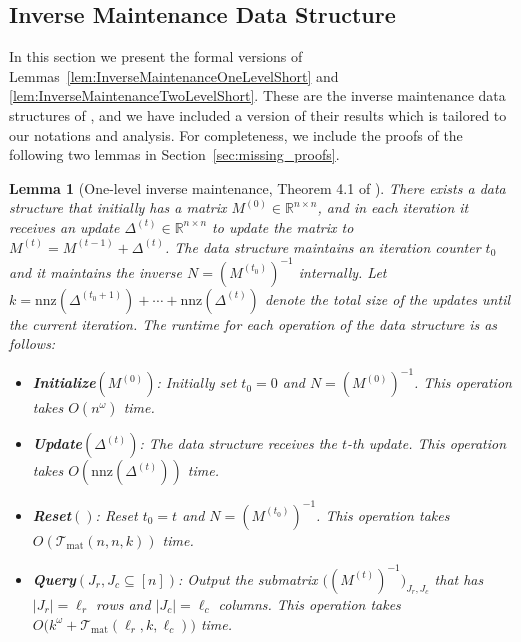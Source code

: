 \documentclass[11pt]{article}
\newtheorem{lemma}[theorem]{Lemma}
\newcommand{\Tmat}{\mathcal{T}_{\mathrm{mat}}}
\newcommand{\nnz}{\mathrm{nnz}}
\newcommand\NN{\boldsymbol{\mathit{N}}}
\newcommand\MM{\boldsymbol{\mathit{M}}}
\newcommand\R{\mathbb{R}}
\begin{document}
\subsection{Inverse Maintenance Data Structure}\label{sec:InverseMaintenance}
In this section we present the formal versions of Lemmas~\ref{lem:InverseMaintenanceOneLevelShort} and \ref{lem:InverseMaintenanceTwoLevelShort}. These are the inverse maintenance data structures of \cite{bns19}, and we have included a version of their results which is tailored to our notations and analysis. For completeness, we include the proofs of the following two lemmas in Section~\ref{sec:missing_proofs}.
\begin{lemma}[One-level inverse maintenance, Theorem 4.1 of \cite{bns19}]
\label{lem:InverseMaintenanceOneLevel}
There exists a data structure that initially has a matrix $\MM^{(0)} \in \R^{n \times n}$, and in each iteration it receives an update $\Delta^{(t)} \in \R^{n \times n}$ to update the matrix to $\MM^{(t)} = \MM^{(t-1)} + \Delta^{(t)}$. The data structure maintains an iteration counter $t_0$ and it maintains the inverse $\NN = (\MM^{(t_0)})^{-1}$ internally. Let $k = \nnz(\Delta^{(t_0+1)}) + \cdots + \nnz(\Delta^{(t)})$ denote the total size of the updates until the current iteration. The runtime for each operation of the data structure is as follows:
\begin{itemize}
\item {\bf Initialize$(\MM^{(0)})$}: Initially set $t_0 = 0$ and $\NN = (\MM^{(0)})^{-1}$. This operation takes $O(n^{\omega})$ time.
\item {\bf Update$(\Delta^{(t)})$}: The data structure receives the $t$-th update. This operation takes $O(\nnz(\Delta^{(t)}))$ time.
\item {\bf Reset$()$}: Reset $t_0 = t$ and $\NN = (\MM^{(t_0)})^{-1}$.  This operation takes $O(\Tmat(n, n, k))$ time.
\item {\bf Query$(J_r, J_c \subseteq [n])$}: Output the submatrix $\big((\MM^{(t)})^{-1} \big)_{J_r, J_c}$ that has $|J_r| = \ell_r$ rows and $|J_c| = \ell_c$ columns. This operation takes $O\big(k^{\omega} + \Tmat(\ell_r, k, \ell_c) \big)$ time.
\end{itemize}
\end{lemma}
\end{document}
